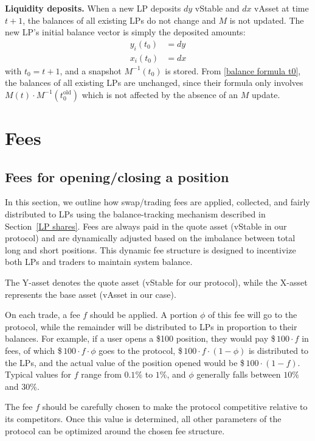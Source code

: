 \documentclass{article}
\begin{document}
\medskip
\noindent\textbf{Liquidity deposits.} When a new LP deposits $dy$ vStable and $dx$ vAsset
at time $t+1$, the balances of all existing LPs do not change and $M$ is not updated. The
new LP's initial balance vector is simply the deposited amounts:
\begin{align}
y_i(t_0) &= dy \\
x_i(t_0) &= dx
\end{align}
with $t_0 = t+1$, and a snapshot $M^{-1}(t_0)$ is stored. From \eqref{balance formula t0},
the balances of all existing LPs are unchanged, since their formula only involves $M(t)
\cdot M^{-1}(t_0^{\text{old}})$ which is not affected by the absence of an $M$ update.



\section{Fees}\label{fees}

\subsection{Fees for opening/closing a position}

In this section, we outline how swap/trading fees are applied, collected, and fairly
distributed to LPs using the balance-tracking mechanism described in Section~\ref{LP shares}.
Fees are always paid in the quote asset (vStable in our protocol) and are dynamically
adjusted based on the imbalance between total long and short positions. This dynamic fee
structure is designed to incentivize both LPs and traders to maintain system balance.

The Y-asset denotes the quote asset (vStable for our protocol), while the X-asset
represents the base asset (vAsset in our case).

On each trade, a fee $f$ should be applied. A portion $\phi$ of this fee will go to the
protocol, while the remainder will be distributed to LPs in proportion to their balances.
For example, if a user opens a \$100 position, they would pay \$\,$100 \cdot f$ in fees, of
which \$\,$100 \cdot f \cdot \phi$ goes to the protocol, \$\,$100 \cdot f \cdot (1-\phi)$ is
distributed to the LPs, and the actual value of the position opened would be
\$\,$100 \cdot (1-f)$. Typical values for $f$ range from $0.1\%$ to $1\%$, and $\phi$
generally falls between $10\%$ and $30\%$.

The fee $f$ should be carefully chosen to make the protocol competitive relative to its
competitors. Once this value is determined, all other parameters of the protocol can be
optimized around the chosen fee structure.
\end{document}
